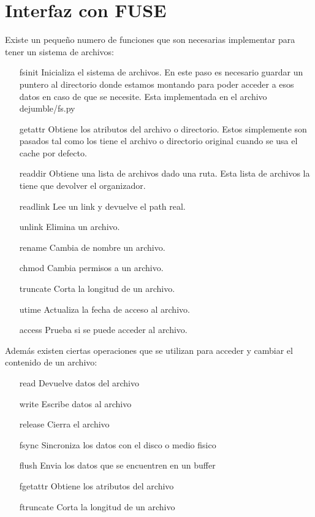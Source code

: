 \section{Interfaz con FUSE}

Existe un pequeño numero de funciones que son necesarias implementar para tener un sistema de archivos:

\begin{itemize}
\item[fsinit] Inicializa el sistema de archivos. En este paso es necesario guardar un puntero al directorio donde estamos montando para poder acceder a esos datos en caso de que se necesite. Esta implementada en el archivo dejumble/fs.py
\item[getattr] Obtiene los atributos del archivo o directorio. Estos simplemente son pasados tal como los tiene el archivo o directorio original cuando se usa el cache por defecto.
\item[readdir] Obtiene una lista de archivos dado una ruta. Esta lista de archivos la tiene que devolver el organizador.
\item[readlink] Lee un link	y devuelve el path real.\item[unlink] Elimina un archivo.
\item[rename] Cambia de nombre un archivo.
\item[chmod] Cambia permisos a un archivo.
\item[truncate] Corta la longitud de un archivo.
\item[utime] Actualiza la fecha de acceso al archivo.
\item[access] Prueba si se puede acceder al archivo.
\end{itemize}

Además existen ciertas operaciones que se utilizan para acceder y cambiar el contenido de un archivo:

\begin{itemize}
\item[read] Devuelve datos del archivo
\item[write] Escribe datos al archivo
\item[release] Cierra el archivo
\item[fsync] Sincroniza los datos con el disco o medio fisico
\item[flush] Envia los datos que se encuentren en un buffer
\item[fgetattr] Obtiene los atributos del archivo
\item[ftruncate] Corta la longitud de un archivo
\end{itemize}




